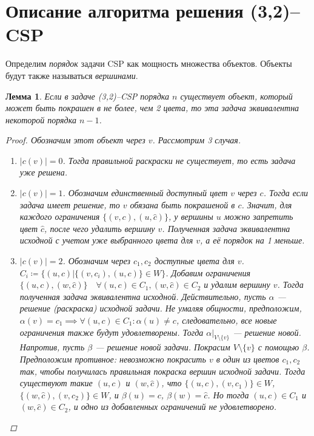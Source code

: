 \documentclass[fleqn]{article}
\theoremstyle{plain}
\theoremstyle{plain}
\theoremstyle{plain}
\newtheorem{lemma}{Лемма}
\theoremstyle{definition}
\begin{document}
\section{Описание алгоритма решения (3,2)--CSP}
Определим \emph{порядок} задачи CSP как мощность множества объектов. Объекты будут также называться \emph{вершинами}.
\begin{lemma}
	Если в задаче (3,2)--CSP порядка $n$ существует объект, который может быть покрашен в не более, чем 2 цвета, то эта задача эквивалентна некоторой порядка $n-1$.
	\begin{proof}
		Обозначим этот объект через $v$. Рассмотрим 3 случая.
		\begin{enumerate}
			\item $|c(v)| = 0$. Тогда правильной раскраски не существует, то есть задача уже решена.
			\item $|c(v)| = 1$. Обозначим единственный доступный цвет $v$ через $c$. Тогда если задача имеет решение, то $v$ обязана быть покрашеной в $c$. Значит, для каждого ограничения $\{(v, c), (u, \widehat{c})\}$, у вершины $u$ можно запретить цвет $\widehat{c}$, после чего удалить вершину $v$. Полученная задача эквивалентна исходной с учетом уже выбранного цвета для $v$, а её порядок на 1 меньше.
			\item $|c(v)| = 2$. Обозначим через $c_1, c_2$ доступные цвета для $v$. $C_i \coloneqq \{(u, c) | \{(v, c_i), (u, c)\} \in W\}$. Добавим ограничения 
$\{(u, c), (w, \widehat{c})\} \quad \forall (u,c) \in C_1, (w,\widehat{c}) \in C_2$ и удалим вершину $v$. Тогда полученная задача эквивалентна исходной. Действительно, пусть $\alpha$ --- решение (раскраска) исходной задачи. Не умаляя общности, предположим, $\alpha(v) = c_1 \implies \forall (u, c) \in C_1 : \alpha(u) \not= c$, следовательно, все новые ограничения также будут удовлетворены. Тогда $\alpha|_{V \setminus \{v\}}$ --- решение новой. Напротив, пусть $\beta$ --- решение новой задачи. Покрасим $V \setminus \{v\}$ с помощью $\beta$. Предположим противное: невозможно покрасить $v$ в один из цветов $c_1, c_2$ так, чтобы получилась правильная покраска вершин исходной задачи. Тогда существуют такие $(u, c)$ и $(w, \widehat{c})$, что $\{(u,c), (v, c_1)\} \in W$, $\{(w, \widehat{c}), (v, c_2)\} \in W$, и $\beta(u) = c$, $\beta(w) = \widehat{c}$. Но тогда $(u,c) \in C_1$ и $(w, \widehat{c}) \in C_2$, и одно из добавленных ограничений не удовлетворено.
		\end{enumerate}
	\end{proof}
\end{lemma}
\end{document}
